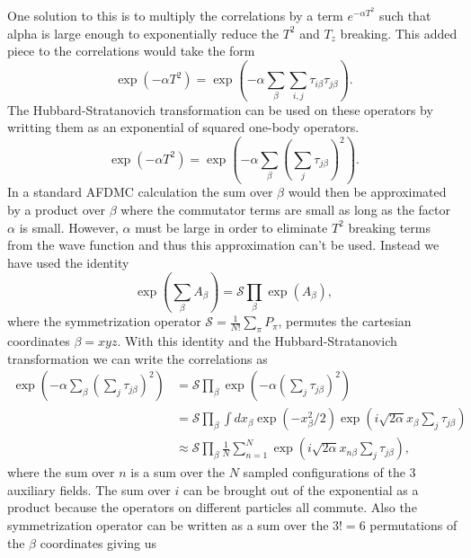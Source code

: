 One solution to this is to multiply the correlations by a term $e^{-\alpha T^2}$ such that alpha is large enough to exponentially reduce the $T^2$ and $T_z$ breaking. This added piece to the correlations would take the form
\begin{equation}
   \exp{\left(-\alpha T^2\right)} = \exp{\left(-\alpha \sum\limits_\beta \sum\limits_{i,j} \tau_{i\beta}\tau_{j\beta}\right)}.
\end{equation}
The Hubbard-Stratanovich transformation can be used on these operators by writting them as an exponential of squared one-body operators.
\begin{equation}
   \exp{\left(-\alpha T^2\right)} = \exp{\left(-\alpha \sum\limits_\beta \left(\sum\limits_{j} \tau_{j\beta}\right)^2\right)}.
\end{equation}
In a standard AFDMC calculation the sum over $\beta$ would then be approximated by a product over $\beta$ where the commutator terms are small as long as the factor $\alpha$ is small. However, $\alpha$ must be large in order to eliminate $T^2$ breaking terms from the wave function and thus this approximation can't be used. Instead we have used the identity
\begin{equation}
   \exp{\left(\sum\limits_\beta A_\beta\right)} = \mathcal{S}\prod\limits_\beta \exp(A_\beta),
\end{equation}
where the symmetrization operator $\mathcal{S}=\frac{1}{N!}\sum\limits_\pi P_\pi$, permutes the cartesian coordinates $\beta=xyz$. With this identity and the Hubbard-Stratanovich transformation we can write the correlations as
\begin{align}
   \exp{\left(-\alpha \sum\limits_\beta \left(\sum\limits_{j} \tau_{j\beta}\right)^2\right)}  &= \mathcal{S} \prod\limits_\beta \exp{\left(-\alpha \left(\sum\limits_{j} \tau_{j\beta}\right)^2\right)} \\
   &= \mathcal{S} \prod\limits_\beta \int dx_\beta \exp{\left(-x_\beta^2/2\right)}\exp{\left(i\sqrt{2\alpha}x_\beta \sum\limits_{j} \tau_{j\beta}\right)} \\
   &\approx \mathcal{S} \prod\limits_\beta \frac{1}{N}\sum\limits_{n=1}^N \exp{\left(i\sqrt{2\alpha}x_{n\beta} \sum\limits_{j} \tau_{j\beta}\right)},
\end{align}
where the sum over $n$ is a sum over the $N$ sampled configurations of the 3 auxiliary fields. The sum over $i$ can be brought out of the exponential as a product because the operators on different particles all commute. Also the symmetrization operator can be written as a sum over the $3!=6$ permutations of the $\beta$ coordinates giving us
